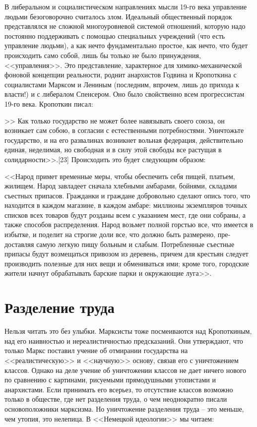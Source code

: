 \documentclass{book}
\begin{document}
В либеральном и социалистическом направлениях мысли 19-го века управление людьми  безоговорочно считалось злом. Идеальный общественный порядок представлялся не сложной многоуровневой системой отношений, которую надо постоян­но поддерживать с помощью специальных учреждений (что есть управление людьми), а как нечто фундаментально простое, как нечто, что будет происходить само собой,  лишь бы только не было принуждения, <<управления>>. Это представление, харак­терное для химико-механической фоновой концепции реаль­ности, роднит анархистов Годвина и Кропоткина с социалиста­ми Марксом и Лениным (последним, впрочем, лишь до при­хода к власти!) и с либералом Спенсером. Оно было свойственно всем прогрессистам 19-го века.
Кропоткин писал:

>> Как только государство не может более навязывать свое­го союза, он возникает сам собою, в согласии с естественными потребностями. Уничтожьте государство, и на его развалинах возникнет вольная федерация, действительно единая, недели­мая, но свободная и в силу этой свободы все растущая в солидарности>>.[23]
Происходить это будет следующим образом:

<<Народ примет временные меры, чтобы обеспечить себя пи­щей, платьем, жилищем. Народ завладеет сначала хлебными ам­барами, бойнями, складами съестных припасов. Гражданки и граждане добровольно сделают опись того, что находится в каждом магазине, в каждом амбаре: миллионы экземпляров точных списков всех товаров будут розданы всем с указанием мест, где они собраны, а также способов распределения. На­род возьмет полной горстью все, что имеется в избытке, и по­делит на строгие доли все, что должно быть размерено, пре­доставляя самую легкую пищу больным и слабым. Потреблен­ные съестные припасы будут возмещаться привозом из дере­вень, причем для крестьян следует производить полезные для них вещи и обмениваться ими; кроме того, городские жители начнут обрабатывать барские парки и окружающие луга>>.


\section{Разделение труда}

Нельзя читать это без улыбки. Марксисты тоже посмеивают­ся над Кропоткиным, над его наивностью и нереалистичностью предсказаний. Они утверждают, что только Маркс поставил учение об отмирании государства на <<реалистическую>> и <<науч­ную>> основу, связав его с уничтожением классов. Однако на деле учение об уничтожении классов не дает ничего нового по сравнению с картинами, рисуемыми прямодушными утописта­ми и анархистами. Если принимать его всерьез, то отсутствие классов возможно только в обществе, где нет разделения тру­да, о чем неоднократно писали основоположники марксизма. Но уничтожение разделения труда -- это меньше, чем утопия, это нелепица. В <<Немецкой идеологии>> мы читаем:
\end{document}
